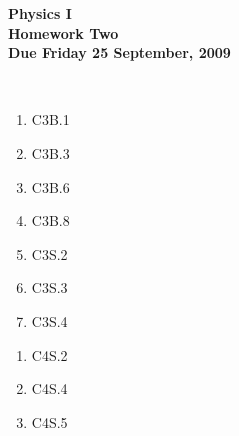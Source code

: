 \documentclass[12pt]{article}
\begin{document}
\pagestyle{empty}
 
\begin{center}
{\large {\bf Physics I}}\\
\medskip
{\large {\bf Homework Two}}\\
\medskip
{ {\bf Due Friday 25 September, 2009}}\\
\end{center}

\hspace{2mm}\\


\begin{enumerate}
\setlength{\itemsep}{-1mm}
  \item C3B.1
  \item C3B.3
  \item C3B.6
  \item C3B.8
  \item C3S.2
  \item C3S.3
  \item C3S.4
\end{enumerate}



\begin{enumerate}
\setlength{\itemsep}{-1mm}
  \item C4S.2
  \item C4S.4
  \item C4S.5
\end{enumerate}
\end{document}
